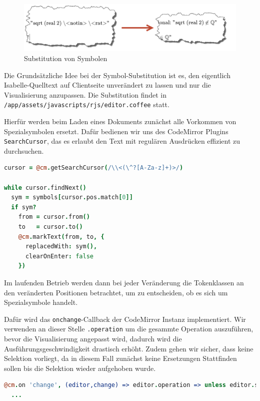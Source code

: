 \begin{figure}[ht]
\includegraphics[width=\linewidth]{images/subst}
  \caption{Substitution von Symbolen}
  \label{fig:subst}
\end{figure}

Die Grundsätzliche Idee bei der Symbol-Substitution ist es, den eigentlich Isabelle-Quelltext auf
Clientseite unverändert zu lassen und nur die Visualisierung anzupassen. Die Substitution findet in
\texttt{/app/assets/javascripts/rjs/editor.coffee} statt.

Hierfür werden beim Laden eines Dokuments zunächst alle Vorkommen von Spezialsymbolen ersetzt. Dafür
bedienen wir uns des CodeMirror Plugins \texttt{SearchCursor}, das es erlaubt den Text mit regulären
Ausdrücken effizient zu durchsuchen.

\begin{lstlisting}[language=coffee]
cursor = @cm.getSearchCursor(/\\<(\^?[A-Za-z]+)>/)

while cursor.findNext()
  sym = symbols[cursor.pos.match[0]]
  if sym?
    from = cursor.from()
    to   = cursor.to()
    @cm.markText(from, to, {
      replacedWith: sym(),
      clearOnEnter: false
    })
\end{lstlisting}

Im laufenden Betrieb werden dann bei jeder Veränderung die Tokenklassen an den veränderten
Positionen betrachtet, um zu entscheiden, ob es sich um Spezialsymbole handelt.

Dafür wird das \texttt{onchange}-Callback der CodeMirror Instanz implementiert. Wir verwenden an
dieser Stelle \texttt{.operation} um die gesammte Operation auszuführen, bevor die Visualisierung
angepasst wird, dadurch wird die Ausführungsgeschwindigkeit drastisch erhöht. Zudem gehen wir
sicher, dass keine Selektion vorliegt, da in diesem Fall zunächst keine Ersetzungen Stattfinden
sollen bis die Selektion wieder aufgehoben wurde.

\begin{lstlisting}[language=coffee]
@cm.on 'change', (editor,change) => editor.operation => unless editor.somethingSelected()
  ...
\end{lstlisting}

